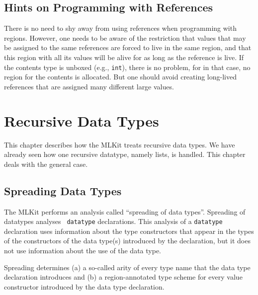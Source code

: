\documentclass[12pt]{book}
\begin{document}
\section{Hints on Programming  with References}
There is no need to shy away from using references when programming
with regions. However, one needs to be aware of the restriction that
values that may be assigned to the same references are forced to live
in the same region, and that this region with all its values will be
alive for as long as the reference is live. If the contents type is
unboxed (e.g., {\tt int}), there is no problem, for in that case, no
region for the contents is allocated. But one should avoid creating
long-lived references that are assigned many different large values.

\chapter{Recursive Data Types}
\label{datatypes.sec}
This chapter describes how the MLKit treats recursive data types. We
have already seen how one recursive datatype, namely lists, is
handled. This chapter deals with the general case.

\section{Spreading Data Types}
The MLKit performs an analysis called 
%
``spreading of data types''.  Spreading of datatypes analyses {\tt
  datatype} declarations.  This analysis of a {\tt datatype}
declaration uses information about the type constructors that appear
in the types of the constructors of the data type(s) introduced by the
declaration, but it does not use information about the use of the data
type.

Spreading determines (a) a so-called 
%
arity of every type name that the data type declaration introduces and
(b) a region-annotated type scheme for every value constructor
introduced by the data type declaration.
\end{document}
